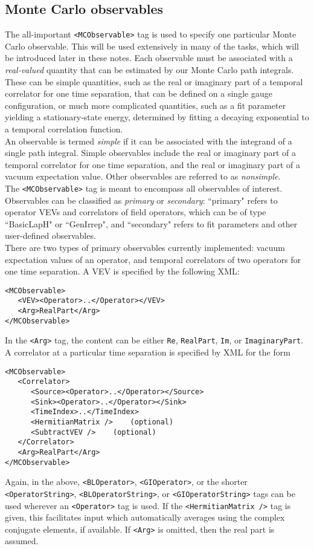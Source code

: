 \documentclass[12pt]{article}
\newcommand{\vb}{\texttt}
\begin{document}
\subsection{Monte Carlo observables} \label{sec:mcobs}

The all-important \vb{<MCObservable>} tag is used to specify one particular
Monte Carlo observable. This will be used extensively in many
of the tasks, which will be introduced later in these notes.
Each observable must be associated with a \textit{real-valued} 
quantity that can be estimated by our Monte Carlo path integrals. 
These can be simple quantities, such as the real or imaginary part of
a temporal correlator for one time separation, that can be
defined on a single gauge configuration, or much more
complicated quantities, such as a fit parameter yielding a
stationary-state energy, determined by fitting a decaying
exponential to a temporal correlation function.\\

An observable is termed \textit{simple} if it can be associated with
the integrand of a single path integral.  Simple observables include
the real or imaginary part of a temporal correlator
for one time separation, and the real or imaginary part of a vacuum 
expectation value.  Other observables are referred to as \textit{nonsimple}.\\

The \vb{<MCObservable>} tag is meant to encompass all observables
of interest.  Observables can be classified as \textit{primary} or
\textit{secondary}:  ``primary" refers to operator VEVs and correlators of 
field operators, which can be of type ``BasicLapH" or ``GenIrrep", and
``secondary" refers to fit parameters and other user-defined 
observables.\\

There are two types of primary observables currently implemented: vacuum
expectation values of an operator, and temporal correlators of two
operators for one time separation.  A VEV is specified by the following XML: 
\begin{verbatim}
<MCObservable>
   <VEV><Operator>..</Operator></VEV>
   <Arg>RealPart</Arg>
</MCObservable>
\end{verbatim}
In the \vb{<Arg>} tag, the content can be either \vb{Re},
\vb{RealPart}, \vb{Im}, or \vb{ImaginaryPart}.
A correlator at a particular time separation is specified by XML for the form
\begin{verbatim}
<MCObservable>
   <Correlator>
      <Source><Operator>..</Operator></Source>
      <Sink><Operator>..</Operator></Sink>
      <TimeIndex>..</TimeIndex>
      <HermitianMatrix />    (optional)
      <SubtractVEV />    (optional)
   </Correlator>
   <Arg>RealPart</Arg>
</MCObservable>
\end{verbatim}
Again, in the above,  \vb{<BLOperator>}, \vb{<GIOperator>}, or the shorter
\vb{<OperatorString>}, \vb{<BLOperatorString>}, or
\vb{<GIOperatorString>} tags can be used wherever an \vb{<Operator>}
tag is used. If the \vb{<HermitianMatrix />} tag is given, this facilitates
input which automatically averages using the complex
conjugate elements, if available.  If \vb{<Arg>} is omitted, then
the real part is assumed.\\
\end{document}
